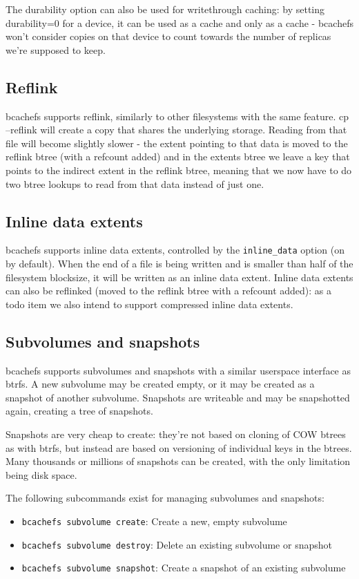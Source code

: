 \documentclass{article}
\begin{document}
The durability option can also be used for writethrough caching: by setting
durability=0 for a device, it can be used as a cache and only as a cache -
bcachefs won't consider copies on that device to count towards the number of
replicas we're supposed to keep.

\subsection{Reflink}

bcachefs supports reflink, similarly to other filesystems with the same feature.
cp --reflink will create a copy that shares the underlying storage. Reading from
that file will become slightly slower - the extent pointing to that data is
moved to the reflink btree (with a refcount added) and in the extents btree we
leave a key that points to the indirect extent in the reflink btree, meaning
that we now have to do two btree lookups to read from that data instead of just
one.

\subsection{Inline data extents}

bcachefs supports inline data extents, controlled by the \texttt{inline\_data}
option (on by default). When the end of a file is being written and is smaller
than half of the filesystem blocksize, it will be written as an inline data
extent. Inline data extents can also be reflinked (moved to the reflink btree
with a refcount added): as a todo item we also intend to support compressed
inline data extents.

\subsection{Subvolumes and snapshots}

bcachefs supports subvolumes and snapshots with a similar userspace interface as
btrfs. A new subvolume may be created empty, or it may be created as a snapshot
of another subvolume. Snapshots are writeable and may be snapshotted again,
creating a tree of snapshots.

Snapshots are very cheap to create: they're not based on cloning of COW btrees
as with btrfs, but instead are based on versioning of individual keys in the
btrees. Many thousands or millions of snapshots can be created, with the only
limitation being disk space.

The following subcommands exist for managing subvolumes and snapshots:
\begin{itemize}
	\item \texttt{bcachefs subvolume create}: Create a new, empty subvolume
	\item \texttt{bcachefs subvolume destroy}: Delete an existing subvolume
		or snapshot
	\item \texttt{bcachefs subvolume snapshot}: Create a snapshot of an
		existing subvolume
\end{itemize}
\end{document}
